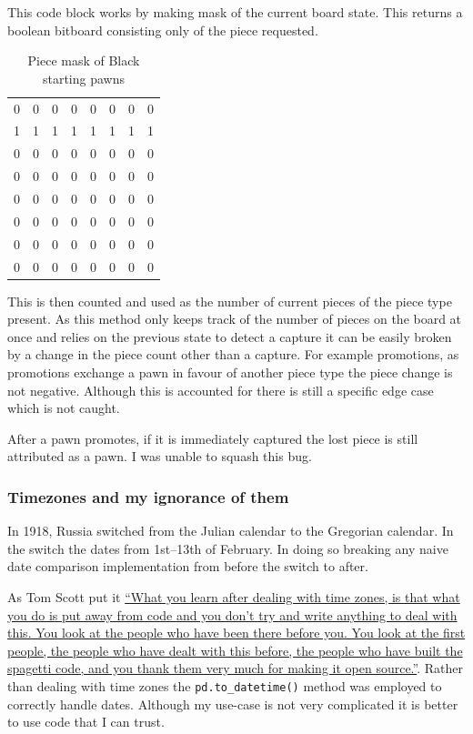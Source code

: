 \documentclass[11pt]{article}
\begin{document}
This code block works by making mask of the current board state. This returns a boolean bitboard consisting only of the piece requested.
\begin{table}[htbp]
\caption{Piece mask of Black starting pawns}
\centering
\begin{tabular}{|rrrrrrrr|}
\hline
0 & 0 & 0 & 0 & 0 & 0 & 0 & 0\\
1 & 1 & 1 & 1 & 1 & 1 & 1 & 1\\
0 & 0 & 0 & 0 & 0 & 0 & 0 & 0\\
0 & 0 & 0 & 0 & 0 & 0 & 0 & 0\\
0 & 0 & 0 & 0 & 0 & 0 & 0 & 0\\
0 & 0 & 0 & 0 & 0 & 0 & 0 & 0\\
0 & 0 & 0 & 0 & 0 & 0 & 0 & 0\\
0 & 0 & 0 & 0 & 0 & 0 & 0 & 0\\
\hline
\end{tabular}
\end{table}
This is then counted and used as the number of current pieces of the piece type present. As this method only keeps track of the number of pieces on the board at once and relies on the previous state to detect a capture it can be easily broken by a change in the piece count other than a capture. For example promotions, as promotions exchange a pawn in favour of another piece type the piece change is not negative. Although this is accounted for there is still a specific edge case which is not caught.

After a pawn promotes, if it is immediately captured the lost piece is still attributed as a pawn. I was unable to squash this bug.
\subsubsection{Timezones and my ignorance of them}
\label{sec:org4ff4bab}
In 1918, Russia switched from the Julian calendar to the Gregorian calendar. In the switch the dates from   1st–13th of February. In doing so breaking any naive date comparison implementation from before the switch to after.

As Tom Scott put it \href{https://youtu.be/-5wpm-gesOY}{``What you learn after dealing with time zones, is that what you do is put away from code and you don't try and write anything to deal with this. You look at the people who have been there before you. You look at the first people, the people who have dealt with this before, the people who have built the spagetti code, and you thank them very much for making it open source.''}. Rather than dealing with time zones the \texttt{pd.to\_datetime()} method was employed to correctly handle dates. Although my use-case is not very complicated it is better to use code that I can trust.
\end{document}
